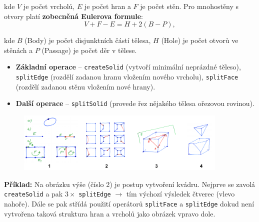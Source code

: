 kde $ V $ je počet vrcholů, $ E $ je počet hran a $ F $ je počet stěn. Pro mnohostěny s otvory platí \textbf{zobecněná Eulerova formule}:
\begin{equation*}
V + F - E = H + 2(B - P),
\end{equation*}

kde $ B $ (Body) je počet disjunktních částí tělesa, $ H $ (Hole) je počet otvorů ve stěnách a $ P $ (Passage) je počet děr v tělese.

\begin{itemize}
	\item \textbf{Základní operace} -- \texttt{createSolid} (vytvoří minimální neprázdné těleso), \texttt{splitEdge} (rozdělí zadanou hranu vložením nového vrcholu), \texttt{splitFace} (rozdělí zadanou stěnu vložením nové hrany).
	\item \textbf{Další operace} -- \texttt{splitSolid} (provede řez nějakého tělesa ořezovou rovinou).
\end{itemize}

\begin{figure}[H]
	\centering
	\includegraphics[width=0.9\textwidth]{assets/4_hranicni_euler}
\end{figure} 

\textbf{Příklad:} Na obrázku výše (číslo 2) je postup vytvoření kvádru. Nejprve se zavolá \texttt{createSolid} a pak $3 \times$ \texttt{splitEdge} $\rightarrow$ tím výchozí výsledek čtverec (vlevo nahoře). Dále se pak střídá použití operátorů \texttt{splitFace} a \texttt{splitEdge} dokud není vytvořena taková struktura hran a vrcholů jako obrázek vpravo dole.

